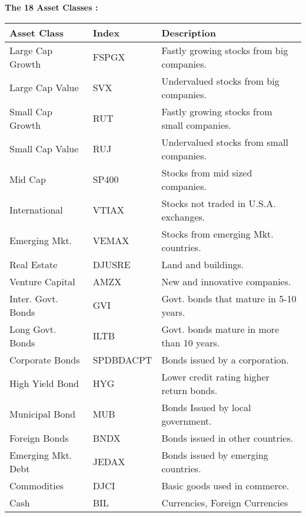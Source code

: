 \documentclass{article}
\begin{document}
\vspace{1cm}
\large
\noindent \textbf{The 18 Asset Classes : }
\normalsize
\vspace{.5cm}
\begin{adjustwidth}{0in}{0in}%
\begin{tabular}{lll} %
    Asset Class & Index & Description\\ \midrule

    Large Cap Growth  & FSPGX & Fastly growing stocks from big companies. \\\midrule
    Large Cap Value & SVX & Undervalued stocks from big companies. \\\midrule
    Small Cap Growth & RUT & Fastly growing stocks from small companies.\\\midrule

    Small Cap Value  & RUJ & Undervalued stocks from small companies. \\\midrule
    Mid Cap  & SP400 & Stocks from mid sized companies. \\\midrule
    International  & VTIAX & Stocks not traded in U.S.A. exchanges. \\\midrule

    Emerging Mkt.  & VEMAX & Stocks from emerging Mkt. countries. \\\midrule
    Real Estate  & DJUSRE & Land and buildings. \\\midrule
    Venture Capital  & AMZX &  New and innovative companies. \\\midrule

Inter. Govt. Bonds  & GVI & Govt. bonds that mature in 5-10 years. \\\midrule
    Long Govt. Bonds  & ILTB & Govt. bonds mature in more than 10 years. \\\midrule

    Corporate Bonds  & SPDBDACPT & Bonds issued by a corporation. \\\midrule
    High Yield Bond  &HYG & Lower credit rating higher return bonds. \\\midrule
    Municipal Bond  & MUB & Bonds Issued by local government. \\\midrule

    Foreign Bonds  & BNDX & Bonds issued in other countries. \\\midrule
    Emerging Mkt. Debt  & JEDAX & Bonds issued by emerging countries. \\\midrule
    Commodities  & DJCI & Basic goods used in commerce.
\\\midrule

    Cash  & BIL & Currencies, Foreign Currencies

    \\ \bottomrule
\end{tabular}
\end{adjustwidth}
\end{document}
